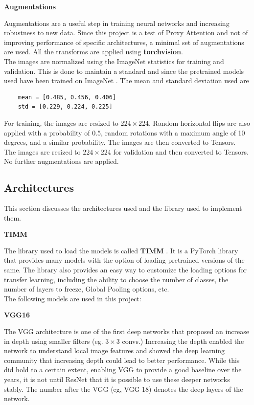 \documentclass[a4paper,11pt,openright]{book}
\begin{document}
\textbf{Augmentations}

Augmentations are a useful step in training neural networks and increasing robustness to new data. Since this project is a test of Proxy Attention and not of improving performance of specific architectures, a minimal set of augmentations are used. All the transforms are applied using \textbf{torchvision}.\\
The images are normalized using the ImageNet statistics for training and validation. This is done to maintain a standard and since the pretrained models used have been trained on ImageNet \cite{dengImageNetLargeScaleHierarchical2009}. The mean and standard deviation used are \begin{verbatim}
    mean = [0.485, 0.456, 0.406]
    std = [0.229, 0.224, 0.225]
\end{verbatim}
For training, the images are resized to $224\times224$. Random horizontal flips are also applied with a probability of $0.5$, random rotations with a maximum angle of 10 degrees, and a similar probability. The images are then converted to Tensors.\\
The images are resized to $224\times224$ for validation and then converted to Tensors. No further augmentations are applied.\\

\subsection{Architectures}
This section discusses the architectures used and the library used to implement them.

\textbf{TIMM}

The library used to load the models is called \textbf{TIMM} \cite{wightmanRwightmanPytorchimagemodelsV02023}. It is a PyTorch library that provides many models with the option of loading pretrained versions of the same. The library also provides an easy way to customize the loading options for transfer learning, including the ability to choose the number of classes, the number of layers to freeze, Global Pooling options, etc.\\
The following models are used in this project:

\textbf{VGG16}

The VGG architecture \cite{simonyanVeryDeepConvolutional2014} is one of the first deep networks that proposed an increase in depth using smaller filters (eg. $3 \times 3$ convs.) Increasing the depth enabled the network to understand local image features and showed the deep learning community that increasing depth could lead to better performance. While this did hold to a certain extent, enabling VGG to provide a good baseline over the years, it is not until ResNet \cite{heDeepResidualLearning2016} that it is possible to use these deeper networks stably. The number after the VGG (eg, VGG 18) denotes the deep layers of the network.
\end{document}
